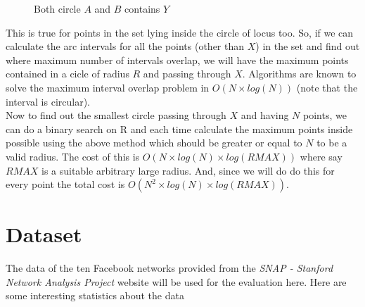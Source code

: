 \documentclass{article}
\begin{document}
        \begin{figure}
            \centering
            \caption{Both circle $A$ and $B$ contains $Y$}
        \end{figure}

        This is true for points in the set lying inside the circle of locus too. So, if we can calculate the arc intervals for all the points (other than $X$) in the set and find out where maximum number of intervals overlap, we will have the maximum points contained in a cicle of radius $R$ and passing through $X$. Algorithms are known to solve the maximum interval overlap problem in $O(N \times log(N))$ (note that the interval is circular). \\

        Now to find out the smallest circle passing through $X$ and having $N$ points, we can do a binary search on R and each time calculate the maximum points inside possible using the above method which should be greater or equal to $N$ to be a valid radius. The cost of this is $O(N \times log(N) \times log(RMAX))$ where say $RMAX$ is a suitable arbitrary large radius. And, since we will do do this for every point the total cost is $O(N^2 \times log(N) \times log(RMAX))$.
    
    \section{Dataset}
    
        The data of the ten Facebook networks provided from the {\em SNAP - Stanford Network Analysis Project} website \cite{snap} will be used for the evaluation here. Here are some interesting statistics about the data
        
\end{document}
